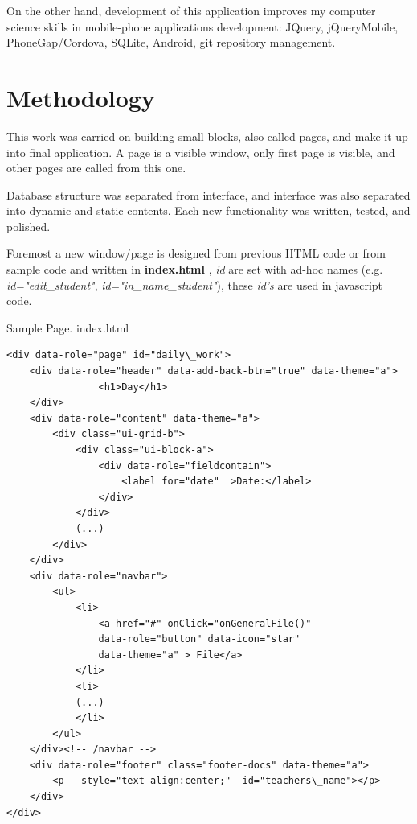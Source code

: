 	On the other hand, development of this application improves my computer science skills in  mobile-phone applications development: JQuery,  jQueryMobile, PhoneGap/Cordova, SQLite, Android,  git repository management.

\section {Methodology \label{Methodology}}
	This work was carried on building small blocks, also called pages, and make it up into final application.
	A page is a visible window, only first page is visible, and other pages are called from this one.
	
	 Database structure was separated from interface, and interface was also separated into dynamic and static contents. Each new
	 functionality was written, tested, and
	polished. 
	
	Foremost a new window/page is designed from previous HTML code or from sample code \cite{SergasApp} and written
	in {\bf index.html} , \emph{id} are set with ad-hoc names  (e.g. \emph{id="edit\_student"}, 
	   \emph{id="in\_name\_student"}),   these \emph{id's} are used in javascript code. 
	   
	   
\begin{bclogo}[couleur=blue!30,arrondi=0.1,ombre=true ] 
{Sample Page. index.html}
\begin{verbatim}
<div data-role="page" id="daily\_work">
    <div data-role="header" data-add-back-btn="true" data-theme="a">
                <h1>Day</h1>
    </div>
    <div data-role="content" data-theme="a">
        <div class="ui-grid-b">
            <div class="ui-block-a">
                <div data-role="fieldcontain">
                    <label for="date"  >Date:</label>
                </div>
            </div>
            (...)
        </div>
    </div>
    <div data-role="navbar">
        <ul>
            <li>
                <a href="#" onClick="onGeneralFile()"  
                data-role="button" data-icon="star"  
                data-theme="a" > File</a>
            </li>
            <li>
            (...)
            </li>
        </ul>
    </div><!-- /navbar -->
    <div data-role="footer" class="footer-docs" data-theme="a">
        <p   style="text-align:center;"  id="teachers\_name"></p>
    </div>
</div> 
\end{verbatim}

\end{bclogo}
	   	   
